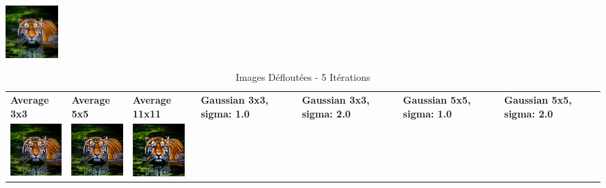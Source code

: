 \begin{table}[h!]
\begin{tabular}
        \includegraphics[width=2cm]{images/processed/tiger/gaussian_5x5_sigma2.0/blurred.png}                                                                                                                                                                                                 \\
    \end{tabular}
\end{table}

\begin{table}[h!]
    \centering
    \captionsetup{justification=centering}
    \caption*{Images Défloutées - 5 Itérations}
    \begin{tabular}{>{\centering\arraybackslash} m{2cm} >{\centering\arraybackslash} m{2cm} >{\centering\arraybackslash} m{2cm} >{\centering\arraybackslash} m{2cm} >{\centering\arraybackslash} m{2cm} >{\centering\arraybackslash} m{2cm} >{\centering\arraybackslash} m{2cm}}
        \textbf{Average 3x3}                                                                           & \textbf{Average 5x5} & \textbf{Average 11x11} & \textbf{Gaussian 3x3, sigma: 1.0} & \textbf{Gaussian 3x3, sigma: 2.0} & \textbf{Gaussian 5x5, sigma: 1.0} & \textbf{Gaussian 5x5, sigma: 2.0} \\
        \includegraphics[width=2cm]{images/processed/tiger/average_3x3/unblurred_5-iter.png}           &
        \includegraphics[width=2cm]{images/processed/tiger/average_5x5/unblurred_5-iter.png}           &
        \includegraphics[width=2cm]{images/processed/tiger/average_11x11/unblurred_5-iter.png}         &

\end{tabular}
\end{table}
